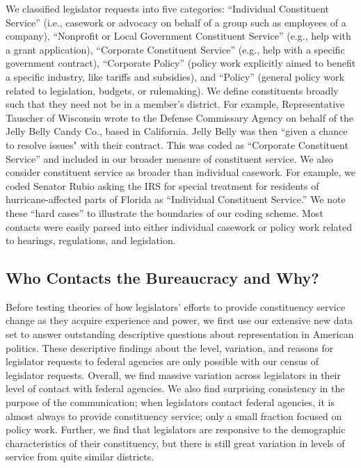 \documentclass[12pt]{article}
\begin{document}
We classified legislator requests into five categories: ``Individual Constituent Service'' (i.e., casework or advocacy on behalf of a group such as employees of a company), ``Nonprofit or Local Government Constituent Service'' (e.g., help with a grant application), ``Corporate Constituent Service'' (e.g., help with a specific government contract), ``Corporate Policy'' (policy work explicitly aimed to benefit a specific industry, like tariffs and subsidies), and ``Policy'' (general policy work related to legislation, budgets, or rulemaking). We define constituents broadly such that they need not be in a member's district. For example, Representative Tauscher of Wisconsin wrote to the Defense Commissary Agency on behalf of the Jelly Belly Candy Co., based in California. Jelly Belly was then ``given a chance to resolve issues" with their contract. This was coded as ``Corporate Constituent Service'' and included in our broader measure of constituent service. We also consider constituent service as broader than individual casework. For example, we coded Senator Rubio asking the IRS for special treatment for residents of hurricane-affected parts of Florida as ``Individual Constituent Service.'' We note these ``hard cases'' to illustrate the boundaries of our coding scheme. Most contacts were easily parsed into either individual casework or policy work related to hearings, regulations, and legislation.


\subsection{Who Contacts the Bureaucracy and Why?} \label{s:descriptive} 
Before testing theories of how legislators' efforts to provide constituency service change as they acquire experience and power, we first use our extensive new data set to answer outstanding descriptive questions about representation in American politics. These descriptive findings about the level, variation, and reasons for legislator requests to federal agencies are only possible with our census of legislator requests. Overall, we find massive variation across legislators in their level of contact with federal agencies. We also find surprising consistency in the purpose of the communication; when legislators contact federal agencies, it is almost always to provide constituency service; only a small fraction focused on policy work. Further, we find that legislators are responsive to the demographic characteristics of their constituency, but there is still great variation in levels of service from quite similar districts.  
\end{document}
